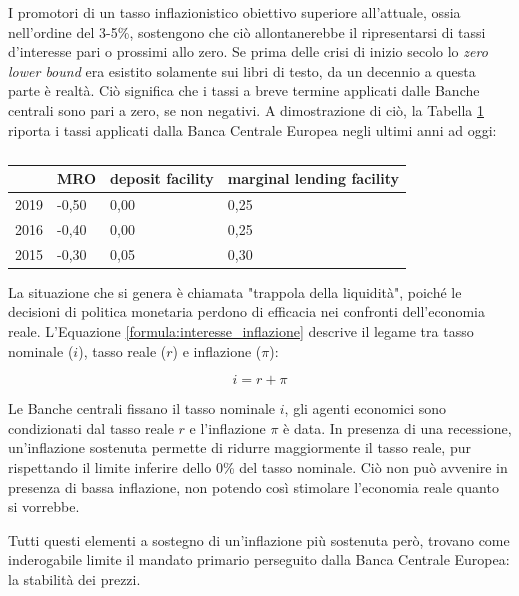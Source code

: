 I promotori di un tasso inflazionistico obiettivo superiore all'attuale, ossia nell'ordine del 3-5\%, sostengono che ciò allontanerebbe il ripresentarsi di tassi d'interesse pari o prossimi allo zero. Se prima delle crisi di inizio secolo lo \textit{zero lower bound} era esistito solamente sui libri di testo, da un decennio a questa parte è realtà. Ciò significa che i tassi a breve termine applicati dalle Banche centrali sono pari a zero, se non negativi. A dimostrazione di ciò, la Tabella \ref{table:tassi_ecb} riporta i tassi applicati dalla Banca Centrale Europea negli ultimi anni ad oggi:

\begin{table}[h]
	\centering
	\begin{tabularx}{.8\textwidth}{@{}llll@{}}
		\toprule
		& \textbf{MRO}   & \textbf{deposit facility} & \textbf{marginal lending facility} \\ \midrule
		2019 & -0,50 & 0,00 & 0,25 \\
		2016 & -0,40 & 0,00 & 0,25 \\
		2015 & -0,30 & 0,05 & 0,30 \\ \bottomrule
	\end{tabularx}
	\caption{}
	\label{table:tassi_ecb}
\end{table}

La situazione che si genera è chiamata "trappola della liquidità", poiché le decisioni di politica monetaria perdono di efficacia nei confronti dell'economia reale. L'Equazione \ref{formula:interesse_inflazione} descrive il legame tra tasso nominale ($i$), tasso reale ($r$) e inflazione ($\pi$):

\begin{equation}
	\label{formula:interesse_inflazione}
	i = r + \pi
\end{equation}

Le Banche centrali fissano il tasso nominale $i$, gli agenti economici sono condizionati dal tasso reale $r$ e l'inflazione $\pi$ è data. In presenza di una recessione, un'inflazione sostenuta permette di ridurre maggiormente il tasso reale, pur rispettando il limite inferire dello 0\% del tasso nominale. Ciò non può avvenire in presenza di bassa inflazione, non potendo così stimolare l'economia reale quanto si vorrebbe.

Tutti questi elementi a sostegno di un'inflazione più sostenuta però, trovano come inderogabile limite il mandato primario perseguito dalla Banca Centrale Europea: la stabilità dei prezzi.

